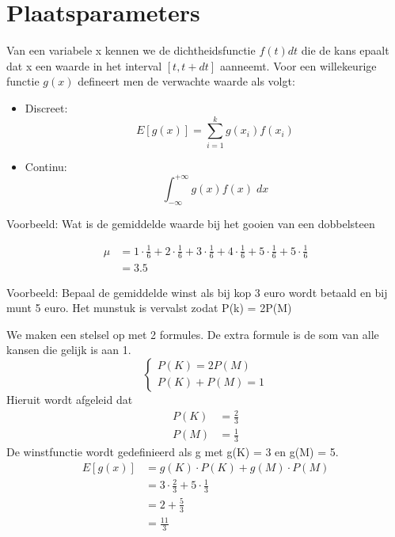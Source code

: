 \documentclass[12pt]{report}
\newcommand{\example}[2]{
      \hrulefill
      
      Voorbeeld: #1
      
      #2
      
      \hrulefill
  }
\begin{document}
\section{Plaatsparameters}
Van een variabele x kennen we de dichtheidsfunctie $f(t)dt$ die de kans epaalt dat x een waarde in het interval $[t, t + dt]$ aanneemt. Voor een willekeurige functie $g(x)$ defineert men de verwachte waarde als volgt:
\begin{itemize}
 \item Discreet: $$E[g(x)] = \sum_{i = 1}^{k} g(x_{i})f(x_i)$$
 \item Continu: $$\int_{-\infty}^{+\infty}g(x)f(x)\; dx$$
\end{itemize}


\example{Wat is de gemiddelde waarde bij het gooien van een dobbelsteen}{
  \begin{equation*}
   \begin{split}
    \mu & = 1\cdot\frac{1}{6} + 2\cdot\frac{1}{6} +3\cdot\frac{1}{6} +4\cdot\frac{1}{6} +5\cdot\frac{1}{6}+ 5\cdot\frac{1}{6}\\
    &= 3.5
   \end{split}
  \end{equation*}
}
\example{Bepaal de gemiddelde winst als bij kop 3 euro wordt betaald en bij munt 5 euro. Het munstuk is vervalst zodat P(k) = 2P(M)}{
We maken een stelsel op met 2 formules. De extra formule is de som van alle kansen die gelijk is aan 1.
$$\begin{cases}
   P(K) = 2P(M) \\
   P(K) + P(M) = 1
  \end{cases}
$$
Hieruit wordt afgeleid dat 
\begin{equation*}
 \begin{split}
   P(K) &= \frac{2}{3} \\
   P(M) &= \frac{1}{3}
 \end{split}
\end{equation*}
De winstfunctie wordt gedefinieerd als g met g(K) = 3 en g(M) = 5.
\begin{equation*}
 \begin{split}
  E[g(x)] & = g(K)\cdot P(K) + g(M)\cdot P(M)\\
          & = 3 \cdot \frac{2}{3} + 5 \cdot \frac{1}{3}\\
          & = 2 + \frac{5}{3}\\
          & = \frac{11}{3}
 \end{split}
\end{equation*}
}
\end{document}
